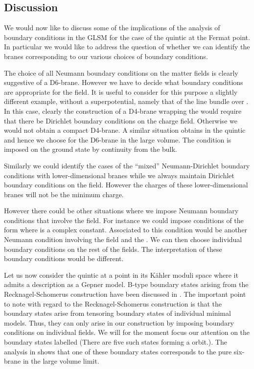 \documentclass[a4paper,12pt]{article}
\def\Bbb{\mathbb}
\def\BZ{\mbox{\myHighlight{$\Bbb Z$}\coordHE{}}} \def\BR{\mbox{\myHighlight{$\Bbb R$}\coordHE{}}}
\begin{document}
\subsection{Discussion}

	We would now like to discuss some of the implications of
the analysis of boundary conditions in the GLSM for the case of
the quintic at the Fermat point. In particular we would like to address
the question of whether we can identify the branes corresponding to our
various choices of boundary conditions. 
 
The choice of all Neumann boundary conditions on the matter fields is
clearly suggestive of a D6-brane. However we have to decide what
boundary conditions are appropriate for the \coordHE{} field. It is useful to
consider for this purpose a slightly different example, without a
superpotential, namely that of the \coordHE{} line bundle over \coordHE{}.
In this case, clearly the construction of a D4-brane wrapping the \coordHE{}
would require that there be Dirichlet boundary conditions on the charge
\coordHE{} field. Otherwise we would not obtain a compact D4-brane. A similar
situation obtains in the quintic and hence we choose \coordHE{} for the
D6-brane in the large volume. The \coordHE{} condition is imposed on the
ground state by continuity from the bulk.  

Similarly we could identify the cases of the ``mixed''
Neumann-Dirichlet boundary conditions with lower-dimensional branes
while we always maintain Dirichlet boundary conditions on the \coordHE{}
field. However the charges of these lower-dimensional branes will not be
the minimum charge.  

However there could be other situations
where we impose Neumann boundary conditions that involve the \coordHE{} field.
For instance we could impose conditions of the form \coordHE{} where
\coordHE{} is a complex constant. Associated to this condition would be another
Neumann condition involving the \coordHE{} field and the \coordHE{}. We can
then choose individual boundary conditions on the rest of the fields.
The interpretation of these boundary conditions would be different. 

Let us now consider the quintic at a point in its K\"ahler moduli
space where it admits a description as a Gepner model. B-type
boundary states arising from the Recknagel-Schomerus construction\cite{RS}
have been discussed in \cite{quintic}. The important point to note with
regard to the Recknagel-Schomerus construction is that the boundary
states arise from tensoring boundary states of individual minimal
models. Thus, they can only arise in our construction
by imposing boundary conditions on individual fields. 
We will for the moment focus our attention on the boundary
states labelled \coordHE{} (There are five such states forming
a \myHighlight{$\BZ_5$}\coordHE{} orbit.). The analysis in \cite{quintic} shows that one
of these boundary states corresponds to the pure six-brane in the
large volume limit.
\end{document}
